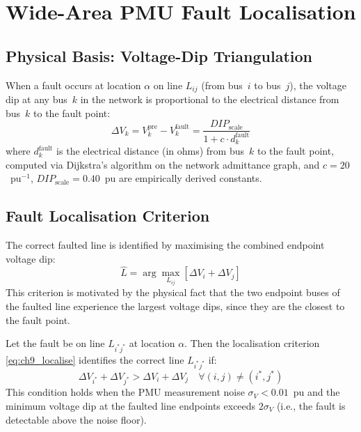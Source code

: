 \section{Wide-Area PMU Fault Localisation}
\label{sec:ch9_wapc}

\subsection{Physical Basis: Voltage-Dip Triangulation}

When a fault occurs at location $\alpha$ on line $L_{ij}$ (from bus~$i$
to bus~$j$), the voltage dip at any bus~$k$ in the network is proportional
to the electrical distance from bus~$k$ to the fault point:
\begin{equation}
  \Delta V_k = V_k^\mathrm{pre} - V_k^\mathrm{fault}
  = \frac{DIP_\mathrm{scale}}{1 + c \cdot d_k^\mathrm{fault}}
  \label{eq:ch9_dip_model}
\end{equation}
where $d_k^\mathrm{fault}$ is the electrical distance (in ohms) from
bus~$k$ to the fault point, computed via Dijkstra's algorithm on the
network admittance graph, and $c = 20$~pu$^{-1}$, $DIP_\mathrm{scale} = 0.40$~pu
are empirically derived constants.

\subsection{Fault Localisation Criterion}

The correct faulted line is identified by maximising the combined endpoint
voltage dip:
\begin{equation}
  \hat{L} = \arg\max_{L_{ij}} \left[\Delta V_i + \Delta V_j\right]
  \label{eq:ch9_localise}
\end{equation}
This criterion is motivated by the physical fact that the two endpoint
buses of the faulted line experience the largest voltage dips, since they
are the closest to the fault point.

\begin{proposition}
\label{prop:ch9_localise}
Let the fault be on line $L_{i^\ast j^\ast}$ at location $\alpha$.
Then the localisation criterion \eqref{eq:ch9_localise} identifies
the correct line $L_{i^\ast j^\ast}$ if:
\begin{equation}
  \Delta V_{i^\ast} + \Delta V_{j^\ast} > \Delta V_i + \Delta V_j
  \quad \forall (i, j) \neq (i^\ast, j^\ast)
  \label{eq:ch9_correct_condition}
\end{equation}
This condition holds when the PMU measurement noise $\sigma_V < 0.01$~pu
and the minimum voltage dip at the faulted line endpoints exceeds
$2\sigma_V$ (i.e., the fault is detectable above the noise floor).
\end{proposition}

